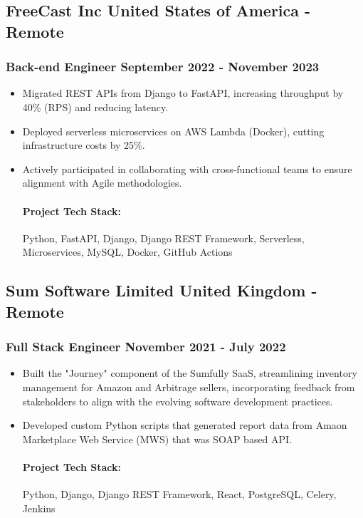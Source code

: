 \documentclass[11pt]{article} %
\begin{document}
\subsection{FreeCast Inc \hfill United States of America - Remote}
\subsubsection{Back-end Engineer \hfill  September 2022 - November 2023}
\begin{itemize}
    \item Migrated REST APIs from Django to FastAPI, increasing throughput by 40\% (RPS) and reducing latency.
    \item Deployed serverless microservices on AWS Lambda (Docker), cutting infrastructure costs by 25\%.
    \item Actively participated in collaborating with cross-functional teams to ensure alignment with Agile methodologies.

    \paragraph{Project Tech Stack:} Python, FastAPI, Django, Django REST Framework, Serverless, Microservices, MySQL, Docker, GitHub Actions
\end{itemize}

\subsection{Sum Software Limited \hfill United Kingdom - Remote}
\subsubsection{Full Stack Engineer \hfill  November 2021 - July 2022}
\begin{itemize}
    \item Built the "Journey" component of the Sumfully SaaS, streamlining inventory management for Amazon and Arbitrage sellers, incorporating feedback from stakeholders to align with the evolving software development practices.
    \item Developed custom Python scripts that generated report data from Amaon Marketplace Web Service (MWS) that was SOAP based API.

    \paragraph{Project Tech Stack:} Python, Django, Django REST Framework, React, PostgreSQL, Celery, Jenkins
\end{itemize}
\end{document}
